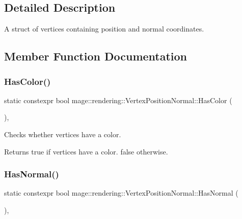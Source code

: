 \subsection{Detailed Description}
A struct of vertices containing position and normal coordinates. 

\subsection{Member Function Documentation}
\mbox{\label{structmage_1_1rendering_1_1_vertex_position_normal_aead42377c86418475bb7b4c93398cd34}} 
\subsubsection{\texorpdfstring{Has\+Color()}{HasColor()}}
{\footnotesize\ttfamily static constexpr bool mage\+::rendering\+::\+Vertex\+Position\+Normal\+::\+Has\+Color (\begin{DoxyParamCaption}{ }\end{DoxyParamCaption})\hspace{0.3cm}{\ttfamily [static]}, {\ttfamily [noexcept]}}

Checks whether vertices have a color.

\begin{DoxyReturn}{Returns}
{\ttfamily true} if vertices have a color. {\ttfamily false} otherwise. 
\end{DoxyReturn}
\mbox{\label{structmage_1_1rendering_1_1_vertex_position_normal_af5a32a3e51ce13c36b665f83f40209b6}} 
\subsubsection{\texorpdfstring{Has\+Normal()}{HasNormal()}}
{\footnotesize\ttfamily static constexpr bool mage\+::rendering\+::\+Vertex\+Position\+Normal\+::\+Has\+Normal (\begin{DoxyParamCaption}{ }\end{DoxyParamCaption})\hspace{0.3cm}{\ttfamily [static]}, {\ttfamily [noexcept]}}

